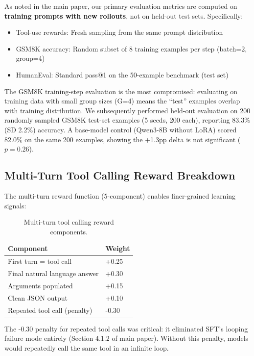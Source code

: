 \documentclass{article}
\begin{document}
As noted in the main paper, our primary evaluation metrics are computed on \textbf{training prompts with new rollouts}, not on held-out test sets. Specifically:
\begin{itemize}
    \item Tool-use rewards: Fresh sampling from the same prompt distribution
    \item GSM8K accuracy: Random subset of 8 training examples per step (batch=2, group=4)
    \item HumanEval: Standard pass@1 on the 50-example benchmark (test set)
\end{itemize}

The GSM8K training-step evaluation is the most compromised: evaluating on training data with small group sizes (G=4) means the ``test'' examples overlap with training distribution. We subsequently performed held-out evaluation on 200 randomly sampled GSM8K test-set examples (5 seeds, 200 each), reporting 83.3\% (SD 2.2\%) accuracy. A base-model control (Qwen3-8B without LoRA) scored 82.0\% on the same 200 examples, showing the +1.3pp delta is not significant ($p{=}0.26$).

\subsection{Multi-Turn Tool Calling Reward Breakdown}

The multi-turn reward function (5-component) enables finer-grained learning signals:

\begin{table}[htbp]
    \centering
    \caption{Multi-turn tool calling reward components.}
    \begin{tabular}{ll}
        \toprule
        Component & Weight \\
        \midrule
        First turn = tool call & +0.25 \\
        Final natural language answer & +0.30 \\
        Arguments populated & +0.15 \\
        Clean JSON output & +0.10 \\
        Repeated tool call (penalty) & -0.30 \\
        \bottomrule
    \end{tabular}
    \label{tab:multiturn_reward}
\end{table}

The -0.30 penalty for repeated tool calls was critical: it eliminated SFT's looping failure mode entirely (Section 4.1.2 of main paper). Without this penalty, models would repeatedly call the same tool in an infinite loop.
\end{document}
